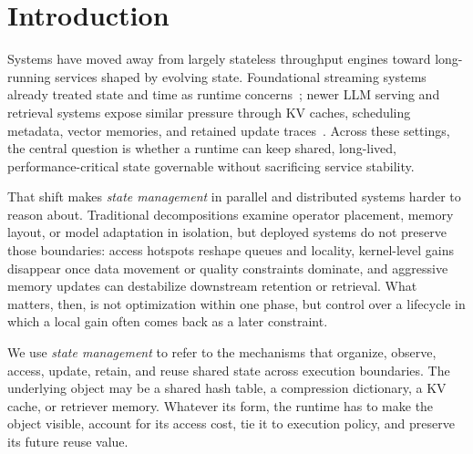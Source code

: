 \documentclass[manuscript]{acmart}
\begin{document}
\maketitle
\renewcommand{\shortauthors}{Zhang et al.}

\section{Introduction}

Systems have moved away from largely stateless throughput engines toward long-running services shaped by evolving state. Foundational streaming systems already treated state and time as runtime concerns~\cite{akidau2013millwheel,murray2013naiad,zaharia2013dstreams,akidau2015dataflow}; newer LLM serving and retrieval systems expose similar pressure through KV caches, scheduling metadata, vector memories, and retained update traces~\cite{kwon2023pagedattention,agrawal2024sarathi,zheng2023sglang,zhou2025ferret,zhang2026flowrag}. Across these settings, the central question is whether a runtime can keep shared, long-lived, performance-critical state governable without sacrificing service stability.

That shift makes \emph{state management} in parallel and distributed systems harder to reason about. Traditional decompositions examine operator placement, memory layout, or model adaptation in isolation, but deployed systems do not preserve those boundaries: access hotspots reshape queues and locality, kernel-level gains disappear once data movement or quality constraints dominate, and aggressive memory updates can destabilize downstream retention or retrieval. What matters, then, is not optimization within one phase, but control over a lifecycle in which a local gain often comes back as a later constraint.

We use \emph{state management} to refer to the mechanisms that organize, observe, access, update, retain, and reuse shared state across execution boundaries. The underlying object may be a shared hash table, a compression dictionary, a KV cache, or retriever memory. Whatever its form, the runtime has to make the object visible, account for its access cost, tie it to execution policy, and preserve its future reuse value.
\end{document}
